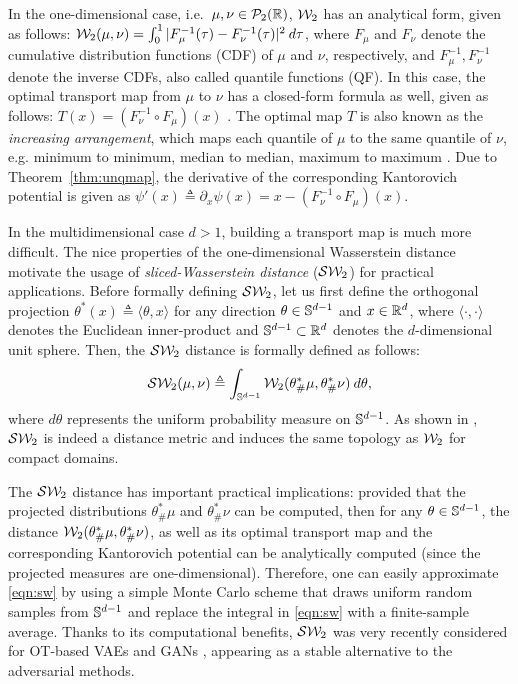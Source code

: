 %
In the one-dimensional case, i.e.\ $\mu,\nu \in {\cal P}_2(\mathbb{R})$, ${\cal W}_2$ has an analytical form, given as follows:
${\cal W}_2(\mu,\nu) = \int_0^1 |F_\mu^{-1}(\tau) - F_\nu^{-1}(\tau)|^2 \> d\tau$, %
where $F_\mu$ and $F_\nu$ denote the cumulative distribution functions (CDF) of $\mu$ and $\nu$, respectively, and $F^{-1}_\mu, F^{-1}_\nu$ denote the inverse CDFs, also called quantile functions (QF).
%
In this case, the optimal transport map from $\mu$ to $\nu$  has a closed-form formula as well, given as follows: $T(x) = (F_\nu^{-1} \circ F_\mu) (x)$ \cite{villani2008optimal}. The optimal map $T$ is also known as the \emph{increasing arrangement}, which maps each quantile of $\mu$ to the same quantile of $\nu$, e.g. minimum to minimum, median to median, maximum to maximum \cite{villani2008optimal}.
%
Due to Theorem~\ref{thm:unqmap}, the derivative of the corresponding Kantorovich potential is given as $\psi'(x) \triangleq \partial_x \psi(x) = x- (F_\nu^{-1} \circ F_\mu) (x)$.

In the multidimensional case $d > 1$, building a transport map is much more difficult. The nice properties of the one-dimensional Wasserstein distance motivate the usage of \emph{sliced-Wasserstein distance} (${\cal S}{\cal W}_2$) for practical applications. Before formally defining ${\cal S}{\cal W}_2$, let us first define the orthogonal projection $\theta^* (x) \triangleq \langle \theta, x \rangle$ for any direction $\theta \in \mathbb{S}^{d-1}$ and $x \in \mathbb{R}^d$, where $\langle \cdot, \cdot \rangle$ denotes the Euclidean inner-product and $\mathbb{S}^{d-1} \subset \mathbb{R}^d$ denotes the $d$-dimensional unit sphere. Then, the ${\cal S}{\cal W}_2$ distance is formally defined as follows:
\begin{align}
{\cal S}{\cal W}_2(\mu,\nu) \triangleq \int_{\mathbb{S}^{d-1}} {\cal W}_2 (\theta^*_\#\mu, \theta^*_\#\nu) \> d \theta, \label{eqn:sw}
\end{align}
where $d\theta$ represents the uniform probability measure on $\mathbb{S}^{d-1}$. As shown in \cite{bonnotte2013unidimensional}, ${\cal S}{\cal W}_2$ is indeed a distance metric and induces the same topology as ${\cal W}_2$ for compact domains.

The ${\cal S}{\cal W}_2$ distance has important practical implications: provided that the projected distributions $\theta^*_\#\mu$ and $\theta^*_\#\nu$ can be computed, then for any $\theta \in \mathbb{S}^{d-1}$, the distance ${\cal W}_2 (\theta^*_\#\mu, \theta^*_\#\nu)$, as well as its optimal transport map and the corresponding Kantorovich potential can be analytically computed (since the projected measures are one-dimensional). Therefore, one can easily approximate \eqref{eqn:sw} by using a simple Monte Carlo scheme that draws uniform random samples from $\mathbb{S}^{d-1}$ and replace the integral in \eqref{eqn:sw} with a finite-sample average. Thanks to its computational benefits, ${\cal S}{\cal W}_2$ was very recently considered for OT-based VAEs and GANs \cite{deshpande2018generative,autotranspoter,kolouri2018sliced}, appearing as a stable alternative to the adversarial methods. 




